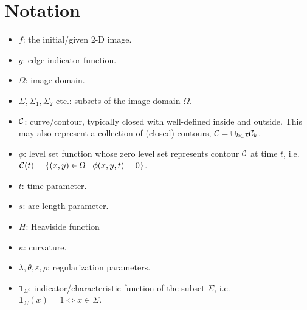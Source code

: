 \section{Notation}
\begin{itemize}
	\item $f$: the initial/given 2-D image.
	
	\item $g$: edge indicator function.
	
	\item $\Omega$: image domain.
	
	\item $\Sigma, \Sigma_1, \Sigma_2$ etc.: subsets of the image domain $\Omega$.
	
	\item $\mathcal{C}$: curve/contour, typically closed with well-defined inside and outside. This may also represent a collection of (closed) contours, $\mathcal{C} = \cup_{k \in \mathcal{I}} \mathcal{C}_k$.
	
	\item $\phi$: level set function whose zero level set represents contour $\mathcal{C}$ at time $t$, i.e. $\mathcal{C}(t) = \{(x,y) \in \Omega \mid \phi(x,y,t) = 0\}$. 
	
	\item $t$: time parameter. 
	
	\item $s$: arc length parameter.
	
	\item $H$: Heaviside function
	
	\item $\kappa$: curvature. 
	
	\item $\lambda, \theta, \varepsilon, \rho$: regularization parameters.
	
	\item $\mathbf{1}_\Sigma$: indicator/characteristic function of the subset $\Sigma$, i.e. $\mathbf{1}_\Sigma(x) = 1 \iff x \in \Sigma$.
	
\end{itemize}